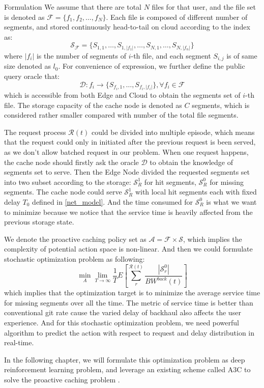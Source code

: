 \documentclass{article}
\begin{document}
\begin{section}{Formulation}
    We assume that there are total $N$ files for that user, and the file set is denoted as $\mathcal{F} = \{f_1, f_2, \dots, f_N\}$. Each file is composed of different number of segments, and stored continuously head-to-tail on cloud according to the index as:
    $$
    \mathcal{S_F} = \{S_{1,1}, \dots, S_{1,|f_1|}, \dots, S_{N,1}, \dots, S_{N,|f_n|}\}
    $$
    where $|f_i|$ is the number of segments of $i$-th file, and each segment $S_{i,j}$ is of same size denoted as $l_0$. For convenience of expression, we further define the public query oracle that:
    $$
    \mathcal{D}:f_i \to \{S_{f_i,1}, \dots, S_{f_i,|f_i|}\}, \forall f_i \in \mathcal{F}
    $$
    which is accessible from both Edge and Cloud to obtain the segments set of $i$-th file. The storage capacity of the cache node is denoted as $C$ segments, which is considered rather smaller compared with number of the total file segments.

    The request process $\mathcal{R}(t)$ could be divided into multiple episode, which means that the request could only in initiated after the previous request is been served, as we don't allow batched request in our problem. When one request happens, the cache node should firstly ask the oracle $\mathcal{D}$ to obtain the knowledge of segments set to serve. Then the Edge Node divided the requested segments set into two subset according to the storage: $\mathcal{S}_R^{1}$ for hit segments, $\mathcal{S}_R^{0}$ for missing segments.
    The cache node could serve $\mathcal{S}_R^{1}$ with local hit segments each with fixed delay $T_0$ defined in \ref{net_model}. And the time consumed for $\mathcal{S}_R^{0}$ is what we want to minimize because we notice that the service time is heavily affected from the previous storage state.

    We denote the proactive caching policy set as $\mathcal{A} =\mathcal{F} \times \mathcal{S}$, which implies the complexity of potential action space is non-linear. And then we could formulate stochastic optimization problem as following:
    $$
    \min_{A} \lim_{T \to \infty} \frac{1}{T} E[\sum_r^{\mathcal{R}(t)} \frac{|\mathcal{S}_{r}^{0}|}{BW^{back}(t)}]
    $$
    which implies that the optimization target is to minimize the average service time for missing segments over all the time. The metric of service time is better than conventional git rate cause the varied delay of backhaul also affects the user experience. And for this stochastic optimization problem, we need powerful algorithm to predict the action with respect to request and delay distribution in real-time.

    In the following chapter, we will formulate this optimization problem as deep reinforcement learning problem, and leverage an existing scheme called A3C to solve the proactive caching problem \cite{a3c}.
\end{section}
\end{document}

